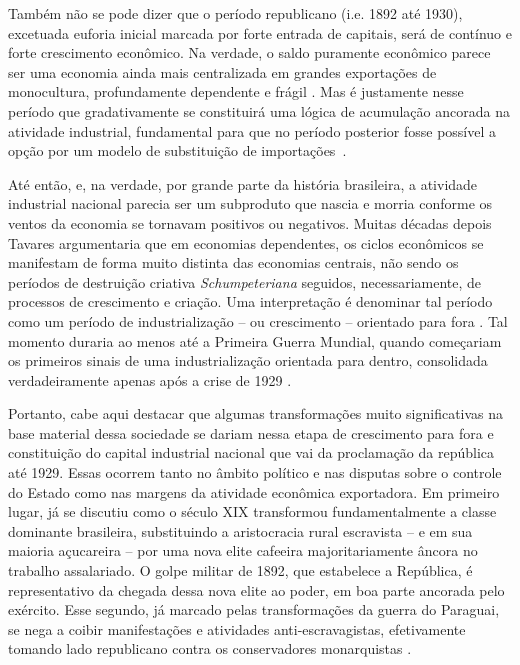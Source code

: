Também não se pode dizer que o período republicano (i.e. 1892 até 1930), excetuada euforia
inicial marcada por forte entrada de capitais, será de contínuo e forte
crescimento econômico. Na verdade, o saldo puramente econômico parece
ser uma economia ainda mais centralizada em grandes exportações de
monocultura, profundamente dependente e frágil
\citep{pradojunior2012}.
Mas é justamente nesse período que gradativamente se constituirá uma
lógica de acumulação ancorada na atividade industrial, fundamental para
que no período posterior fosse possível a opção por um modelo de
substituição de
importações~\citep{mello1982,tavares1973}.

Até então, e, na verdade, por grande parte da história brasileira, a
atividade industrial nacional parecia ser um subproduto que nascia e
morria conforme os ventos da economia se tornavam positivos ou
negativos. Muitas décadas depois Tavares
\citep{tavares1973}
argumentaria que em economias dependentes, os ciclos econômicos se
manifestam de forma muito distinta das economias centrais, não sendo os
períodos de destruição criativa \emph{Schumpeteriana} seguidos,
necessariamente, de processos de crescimento e criação. Uma
interpretação é denominar tal período como um período de
industrialização -- ou crescimento -- orientado para fora
\citep{mello1982}. Tal
momento duraria ao menos até a Primeira Guerra Mundial, quando
começariam os primeiros sinais de uma industrialização
orientada para dentro, consolidada verdadeiramente apenas após a crise
de 1929 \citep{mello1982}.

Portanto, cabe aqui destacar que algumas transformações muito
significativas na base material dessa sociedade se dariam nessa etapa de
crescimento para fora e constituição do capital industrial nacional que
vai da proclamação da república até 1929. Essas ocorrem tanto no âmbito
político e nas disputas sobre o controle do Estado como nas margens da
atividade econômica exportadora. Em primeiro lugar, já se discutiu como
o século XIX transformou fundamentalmente a classe dominante brasileira,
substituindo a aristocracia rural escravista -- e em sua maioria
açucareira -- por uma nova elite cafeeira majoritariamente âncora no
trabalho assalariado. O golpe militar de 1892, que estabelece a
República, é representativo da chegada dessa nova elite ao poder, em boa parte 
ancorada pelo exército. Esse segundo, já marcado pelas
transformações da guerra do Paraguai, se nega a coibir manifestações e
atividades anti-escravagistas, efetivamente tomando lado republicano
contra os conservadores monarquistas
\citep{pradojunior2012}.

